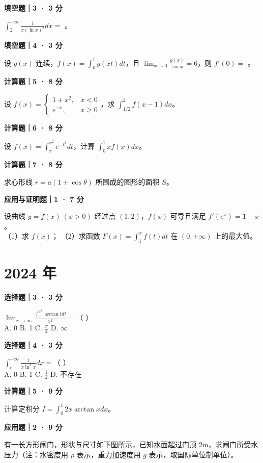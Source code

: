 \textbf{填空题｜3 · 3 分}

$\int_2^{+\infty} \frac{1}{x(\ln x)^2} dx = $ \underline{\hspace{3cm}}。


\textbf{填空题｜4 · 3 分}

设 $g(x)$ 连续，$f(x) = \int_0^1 g(xt) dt$，且 $\lim_{x \to 0} \frac{g(x)}{\sin x} = 6$，则 $f'(0) = $ \underline{\hspace{3cm}}。


\textbf{计算题｜5 · 8 分}

设 $f(x) = \begin{cases} 1+x^2, & x < 0 \\ e^{-x}, & x \ge 0 \end{cases}$，求 $\int_{1/2}^2 f(x-1) dx$。


\textbf{计算题｜6 · 8 分}

设 $f(x) = \int_x^{x^2} e^{-t^2} dt$，计算 $\int_0^1 xf(x) dx$。


\textbf{计算题｜7 · 8 分}

求心形线 $r = a(1 + \cos\theta)$ 所围成的图形的面积 $S$。


\textbf{应用与证明题｜1 · 7 分}

设曲线 $y = f(x) \ (x > 0)$ 经过点 $(1, 2)$，$f(x)$ 可导且满足 $f'(e^x) = 1 - x$。\\
（1）求 $f(x)$； \quad （2）求函数 $F(x) = \int_1^x f(t) dt$ 在 $(0, +\infty)$ 上的最大值。


\section*{2024 年}


\textbf{选择题｜3 · 3 分}

$\lim_{x \to \infty} \frac{\int_0^{x^2} \arctan t dt}{x^2} =$（ \quad ）\\
A. 0 \quad B. 1 \quad C. $\frac{\pi}{2}$ \quad D. $\infty$


\textbf{选择题｜4 · 3 分}

$\int_e^{+\infty} \frac{1}{x \ln^2 x} dx =$（ \quad ）\\
A. 0 \quad B. 1 \quad C. $\frac{1}{2}$ \quad D. 不存在


\textbf{计算题｜5 · 9 分}

计算定积分 $I = \int_0^1 2x \arctan x dx$。


\textbf{应用题｜2 · 9 分}

有一长方形闸门，形状与尺寸如下图所示，已知水面超过门顶 2m，求闸门所受水压力（注：水密度用 $\rho$ 表示，重力加速度用 $g$ 表示，取国际单位制单位）。


